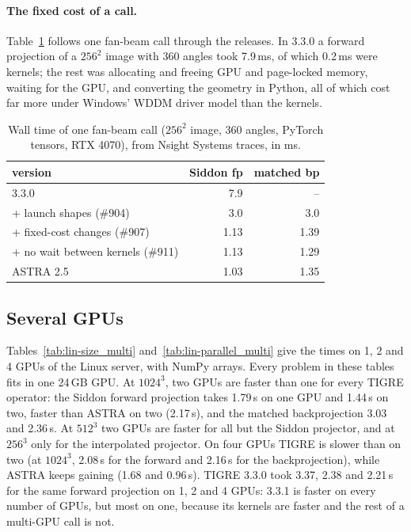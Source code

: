 \documentclass[11pt,a4paper]{article}
\begin{document}
\paragraph{The fixed cost of a call.}
Table~\ref{tab:fixedcost} follows one fan-beam call through the releases. In 3.3.0 a forward projection of a
$256^2$ image with 360 angles took 7.9\,ms, of which 0.2\,ms were kernels; the rest was allocating and freeing
GPU and page-locked memory, waiting for the GPU, and converting the geometry in Python, all of which cost far
more under Windows' WDDM driver model than the kernels.

\begin{table}[H]
\centering\small
\caption{Wall time of one fan-beam call ($256^2$ image, 360 angles, PyTorch tensors, RTX 4070), from Nsight
Systems traces, in ms.}
\label{tab:fixedcost}
\begin{tabular}{lrr}
\toprule
version & Siddon fp & matched bp \\
\midrule
3.3.0 & 7.9 & -- \\
+ launch shapes (\#904) & 3.0 & 3.0 \\
+ fixed-cost changes (\#907) & 1.13 & 1.39 \\
+ no wait between kernels (\#911) & 1.13 & 1.29 \\
ASTRA 2.5 & 1.03 & 1.35 \\
\bottomrule
\end{tabular}
\end{table}

\subsection{Several GPUs}
Tables~\ref{tab:lin-size_multi} and~\ref{tab:lin-parallel_multi} give the times on 1, 2 and 4 GPUs of the Linux
server, with NumPy arrays. Every problem in these tables fits in one 24\,GB GPU. At $1024^3$, two GPUs are faster
than one for every TIGRE operator: the Siddon forward projection takes 1.79\,s on one GPU and 1.44\,s on two, faster
than ASTRA on two (2.17\,s), and the matched backprojection 3.03 and 2.36\,s. At $512^3$ two GPUs are faster for all
but the Siddon projector, and at $256^3$ only for the interpolated projector. On four GPUs TIGRE is slower than on two (at $1024^3$, 2.08\,s
for the forward and 2.16\,s for the backprojection), while ASTRA keeps gaining (1.68 and 0.96\,s). TIGRE 3.3.0 took
3.37, 2.38 and 2.21\,s for the same forward projection on 1, 2 and 4 GPUs: 3.3.1 is faster on every number of
GPUs, but most on one, because its kernels are faster and the rest of a multi-GPU call is not.
\end{document}
